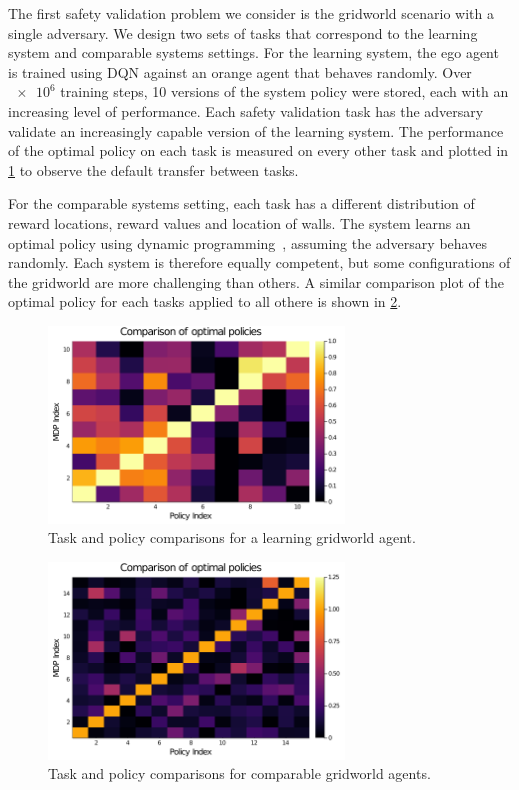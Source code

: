 The first safety validation problem we consider is the gridworld scenario with a single adversary. We design two sets of tasks that correspond to the learning system and comparable systems settings. For the learning system, the ego agent is trained using DQN against an orange agent that behaves randomly. Over $\num{e6}$ training steps, \num{10} versions of the system policy were stored, each with an increasing level of performance. Each safety validation task has the adversary validate an increasingly capable version of the learning system. The performance of the optimal policy on each task is measured on every other task and plotted in \cref{fig:ch7_comps_lgw} to observe the default transfer between tasks. 

For the comparable systems setting, each task has a different distribution of reward locations, reward values and location of walls. The system learns an optimal policy using dynamic programming~\cite{dmubook}, assuming the adversary behaves randomly. Each system is therefore equally competent, but some configurations of the gridworld are more challenging than others. A similar comparison plot of the optimal policy for each tasks applied to all othere is shown in \cref{fig:ch7_comps_cgw}.

\begin{figure}
    \centering
    \includegraphics[width=0.7\textwidth]{figures/iterative_validation/gridworld_improving.png}
    \caption{Task and policy comparisons for a learning gridworld agent.}
    \label{fig:ch7_comps_lgw}
\end{figure}

\begin{figure}
    \centering
    \includegraphics[width=0.7\textwidth]{figures/iterative_validation/moving_rewards_heatmap_bigbatch.png}
    \caption{Task and policy comparisons for comparable gridworld agents.}
    \label{fig:ch7_comps_cgw}
\end{figure}


